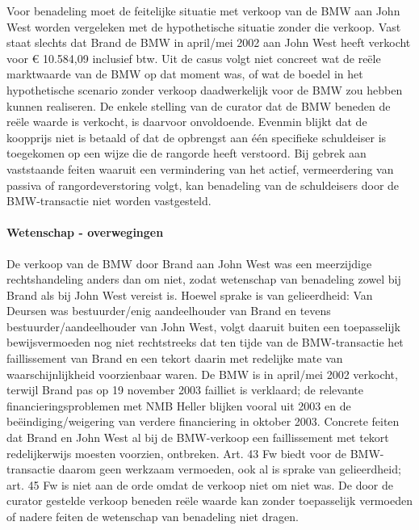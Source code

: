 \documentclass[
  dutch,
  a4paper,
]{article}
\begin{document}
Voor benadeling moet de feitelijke situatie met verkoop van de BMW aan John West worden vergeleken met de hypothetische situatie zonder die verkoop. Vast staat slechts dat Brand de BMW in april/mei 2002 aan John West heeft verkocht voor € 10.584,09 inclusief btw. Uit de casus volgt niet concreet wat de reële marktwaarde van de BMW op dat moment was, of wat de boedel in het hypothetische scenario zonder verkoop daadwerkelijk voor de BMW zou hebben kunnen realiseren. De enkele stelling van de curator dat de BMW beneden de reële waarde is verkocht, is daarvoor onvoldoende. Evenmin blijkt dat de koopprijs niet is betaald of dat de opbrengst aan één specifieke schuldeiser is toegekomen op een wijze die de rangorde heeft verstoord. Bij gebrek aan vaststaande feiten waaruit een vermindering van het actief, vermeerdering van passiva of rangordeverstoring volgt, kan benadeling van de schuldeisers door de BMW-transactie niet worden vastgesteld.

\paragraph{Wetenschap - overwegingen}\label{wetenschap---overwegingen-61}

De verkoop van de BMW door Brand aan John West was een meerzijdige rechtshandeling anders dan om niet, zodat wetenschap van benadeling zowel bij Brand als bij John West vereist is. Hoewel sprake is van gelieerdheid: Van Deursen was bestuurder/enig aandeelhouder van Brand en tevens bestuurder/aandeelhouder van John West, volgt daaruit buiten een toepasselijk bewijsvermoeden nog niet rechtstreeks dat ten tijde van de BMW-transactie het faillissement van Brand en een tekort daarin met redelijke mate van waarschijnlijkheid voorzienbaar waren. De BMW is in april/mei 2002 verkocht, terwijl Brand pas op 19 november 2003 failliet is verklaard; de relevante financieringsproblemen met NMB Heller blijken vooral uit 2003 en de beëindiging/weigering van verdere financiering in oktober 2003. Concrete feiten dat Brand en John West al bij de BMW-verkoop een faillissement met tekort redelijkerwijs moesten voorzien, ontbreken. Art. 43 Fw biedt voor de BMW-transactie daarom geen werkzaam vermoeden, ook al is sprake van gelieerdheid; art. 45 Fw is niet aan de orde omdat de verkoop niet om niet was. De door de curator gestelde verkoop beneden reële waarde kan zonder toepasselijk vermoeden of nadere feiten de wetenschap van benadeling niet dragen.

\newpage
\end{document}

